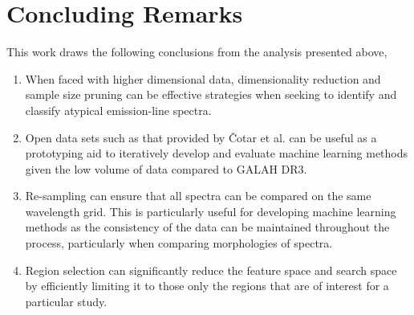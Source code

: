\section{Concluding Remarks}

This work draws the following conclusions from the analysis presented above,

\begin{enumerate}
\item When faced with higher dimensional data, dimensionality reduction and sample size pruning can be effective strategies when seeking to identify and classify atypical emission-line spectra. 

\item Open data sets such as that provided by Čotar et al. can be useful as a prototyping aid to iteratively develop and evaluate machine learning methods given the low volume of data compared to GALAH DR3. 

\item Re-sampling can ensure that all spectra can be compared on the same wavelength grid. This is particularly useful for developing machine learning methods as the consistency of the data can be maintained throughout the process, particularly when comparing morphologies of spectra.  

\item Region selection can significantly reduce the feature space and search space by efficiently limiting it to those only the regions that are of interest for a particular study. 
\end{enumerate}

